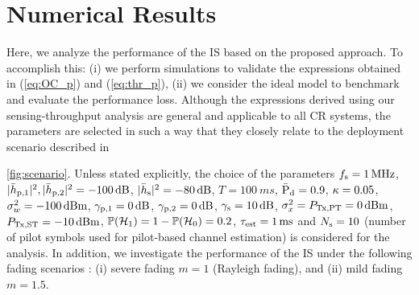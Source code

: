 \section{Numerical Results} \label{sec:num_ana}
Here, we analyze the performance of the IS based on the proposed approach. To accomplish this: (i) we perform simulations to validate the expressions obtained in (\ref{eq:OC_p}) and (\ref{eq:thr_p}), (ii) we consider the ideal model to benchmark and evaluate the performance loss. %
Although the expressions derived using our sensing-throughput analysis are general and applicable to all CR systems, the parameters are selected in such a way that they closely relate to the deployment scenario described in \figurename~{\ref{fig:scenario}. Unless stated explicitly, the choice of the parameters $f_{\text{s}} = \SI{1}{MHz}$, $|\bar{h}_{\text{p,1}}|^2, |\bar{h}_{\text{p,2}}|^2 = \SI{-100}{dB}$, $|\bar{h}_{\text{s}}|^2 = \SI{-80}{dB}$, $T = \SI{100}{ms}$, $\bar{\text{P}}_{\text{d}} = 0.9$, $\kappa = 0.05$, $\sigma^2_{w} = \SI{-100}{dBm}$, ${\gamma}_{\text{p,1}} = \SI{0}{dB}$, ${\gamma}_{\text{p,2}} = \SI{0}{dB}$, ${\gamma}_{\text{s}} = \SI{10}{dB}$, $\sigma^2_{x} = P_{\text{Tx,PT}} = \SI{0}{dBm}$, $P_{\text{Tx,ST}} = -\SI{10}{dBm}$, $\mathbb P(\mathcal{H}_1) = 1 - \mathbb P(\mathcal{H}_0) = 0.2$, $\tau_{\text{est}} = \SI{1}{ms}$ and $N_{\text{s}} =  10$ (number of pilot symbols used for pilot-based channel estimation) is considered for the analysis. In addition, we investigate the performance of the IS under the following fading scenarios : (i) severe fading $m = 1$ (Rayleigh fading), and (ii) mild fading $m = 1.5$. 
 

}
